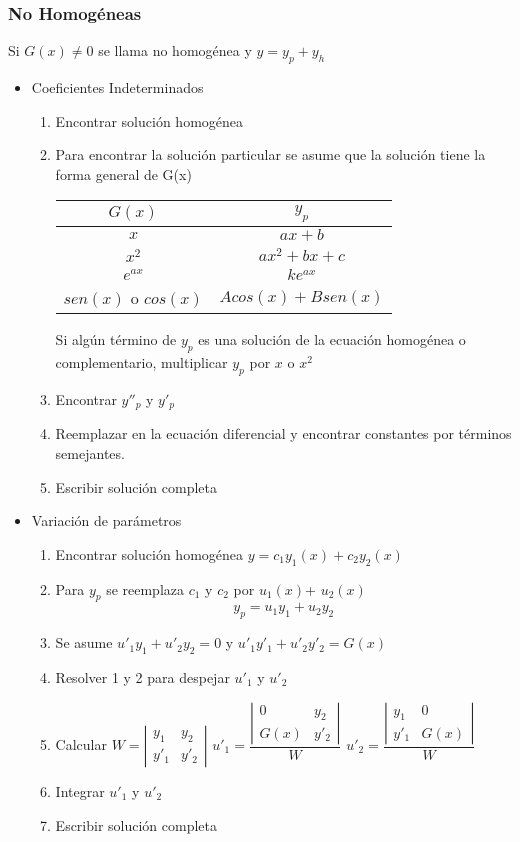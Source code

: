\subsubsection{No Homogéneas}
Si $G(x)\not =0$ se llama no homogénea y
$y=y_p+y_h$
\begin{itemize}
	\item Coeficientes Indeterminados
	\begin{enumerate}
		\item Encontrar solución homogénea
		\item Para encontrar la solución particular se asume que la solución tiene la forma general de G(x)
		
		\begin{tabular}{c|c}
			$G(x)$&$y_p$\\
			\hline
			$x$&$ax+b$\\
			$x^2$ & $ax^2+bx+c$\\
			$e^{ax}$ & $ke^{ax}$\\
			$sen(x)$ o $cos(x)$ & $Acos(x)+Bsen(x)$
		\end{tabular}
	
		Si algún término de $y_p$ es una solución de la ecuación homogénea o complementario, multiplicar $y_p$ por $x$ o $x^2$
		\item Encontrar $y''_p$ y $y'_p$
		\item Reemplazar en la ecuación diferencial y encontrar constantes por términos semejantes.
		\item Escribir solución completa
	\end{enumerate}
	\item Variación de parámetros
	\begin{enumerate}
		\item Encontrar solución homogénea $y=c_1y_1(x)+c_2y_2(x)$
		\item Para $y_p$ se reemplaza $c_1$ y $c_2$ por $u_1(x)$+ $u_2(x)$
		$$y_p=u_1y_1+u_2y_2$$
		\item Se asume $u'_1y_1+u'_2y_2=0$ y $u'_1y'_1+u'_2y'_2=G(x)$
		\item Resolver 1 y 2 para despejar $u'_1$ y $u'_2$
		\item Calcular $W=\left| \begin{array}{cc}
		y_1 & y_2\\
		y'_1 & y'_2
		\end{array}\right| $ $u'_1=\dfrac{\left| \begin{array}{cc}
			0 & y_2\\
			G(x) & y'_2
			\end{array}\right| }{W}$ $u'_2=\dfrac{\left| \begin{array}{cc}
			y_1 & 0\\
			y'_1 & G(x)
			\end{array}\right| }{W}$
		\item Integrar $u'_1$ y $u'_2$
		\item Escribir solución completa
	\end{enumerate}
\end{itemize}

